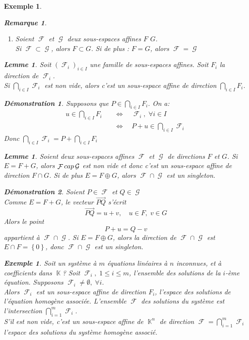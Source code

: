 \documentclass[a4paper, oneside]{report}
\theoremstyle{break}
\newtheorem{lemme}[thm]{Lemme}
\newtheorem{exemple}[thm]{Exemple}
\newtheorem{remarque}[thm]{Remarque}
\newtheorem*{demonstration}{Démonstration}
\DeclareMathOperator{\K}{\mathbb{K}}
\DeclareMathOperator{\F}{\mathcal{F}}
\DeclareMathOperator{\G}{\mathcal{G}}
\DeclarePairedDelimiter\ens{\left\{ }{\right\} }%
\renewcommand{\ens}[1]{\left\{ #1 \right\} }%
\newcommand{\ensF}{\F}
\newcommand{\ensG}{\G}
\begin{document}
\begin{exemple}
\begin{remarque}
\begin{enumerate}
\medbreak

\item  Soient $\ensF$ et $\ensG$ deux sous-espaces affines $F$ $G$.\\
Si $\ensF \subset \ensG$, alors $F \subset G$. Si de plus : $F = G$, alors $\ensF = \ensG$

\end{enumerate}
\end{remarque}

\begin{lemme}
Soit $(\ensF_i)_{i \in I}$ une famille de sous-espaces affines. Soit $F_i$ la direction de $\ensF_i$.\\
Si $\bigcap\limits_{i \in I} \ensF_i$ est non vide, alors c'est un sous-espace affine de direction $\bigcap\limits_{i \in I} F_i$.
\end{lemme}

\begin{demonstration}
Supposons que $P \in \bigcap\limits_{i \in I} F_i$. On a:
\begin{align*}
u \in \bigcap_{i \in I} F_i 	\quad	&\Leftrightarrow	\quad	\ensF_i, \; \forall i \in I
\\
&\Leftrightarrow	\quad	P + u \in \bigcap_{i \in I} \ensF_i
\end{align*}
Donc $\bigcap\limits_{i \in I} \ensF_i = P + \bigcap\limits_{i \in I} F_i$
\end{demonstration}

\begin{lemme}
Soient deux sous-espaces affines $\ensF$ et $\ensG$ de directions $F$ et $G$. Si $E = F  + G$, alors $\ensF \\cap \ensG$ est non vide et donc c'est un sous-espace affine de direction $F \cap G$. Si de plus $E = F \oplus G$, alors $\ensF \cap \ensG$ est un singleton.
\end{lemme}

\begin{demonstration}
Soient $P \in \ensF$ et $Q \in \ensG$\\
Comme $E = F + G$, le vecteur $\vec{PQ}$ s'écrit
\[
\vec{PQ} = u + v,		\quad	u \in F, \; v \in G
\]
Alors le point
\[
P + u = Q - v
\]
appartient à $\ensF \cap \ensG$. Si $E = F \oplus G$, alors la direction de $\ensF \cap \ensG$ est $E \cap F = \ens{0}$, donc $\ensF \cap \ensG$ est un singleton.
\end{demonstration}

\begin{exemple}
Soit un système à $m$ équations linéaires à $n$ inconnues, et à coefficients dans $\K$? Soit $\ensF_i, \; 1 \leq i \leq m$, l'ensemble des solutions de la $i$-ème équation. Supposons $\ensF_i \neq \emptyset, \; \forall i$.\\
Alors $\ensF_i$ est un sous-espace affine de direction $F_i$, l'espace des solutions de l'équation homogène associée. L'ensemble $\ensF$ des solutions du système est l'intersection $\bigcap_{i = 1}^m \ensF_i$.\\
S'il est non vide, c'est un sous-espace affine de $\K^n$ de direction $\ensF = \bigcap_{i = 1}^m \ensF_i$ l'espace des solutions du système homogène associé.
\end{exemple}


\end{exemple}
\end{document}
